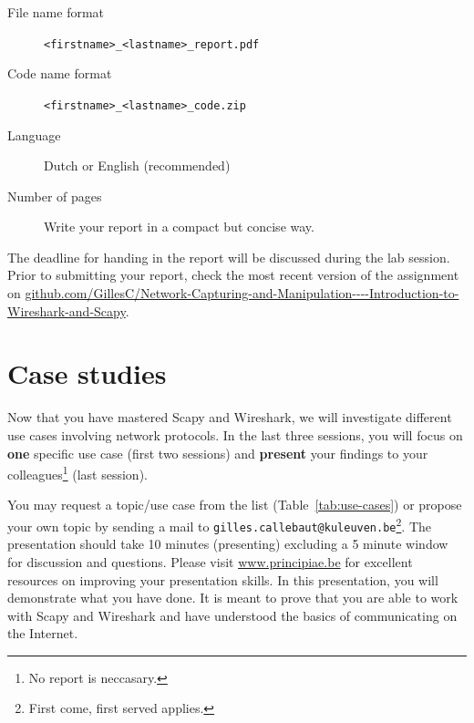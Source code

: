 \documentclass[11pt,a4paper]{article}
\begin{document}
\begin{description}
	\item[File name format]  \texttt{<firstname>\_<lastname>\_report.pdf}
	\item[Code name format]  \texttt{<firstname>\_<lastname>\_code.zip}
	\item[Language] Dutch or English (recommended)
	\item[Number of pages] Write your report in a compact but concise way.
\end{description}


The deadline for handing in the report will be discussed during the lab session.
Prior to submitting your report, check the most recent version of the assignment on \url{github.com/GillesC/Network-Capturing-and-Manipulation----Introduction-to-Wireshark-and-Scapy}.



\section{Case studies}
Now that you have mastered Scapy and Wireshark, we will investigate different use cases involving network protocols. In the last three sessions, you will focus on \textbf{one} specific use case (first two sessions) and \textbf{present} your findings to your colleagues\footnote{No report is neccasary.} (last session). 

You may request a topic/use case from the list (Table~\ref{tab:use-cases}) or propose your own topic by sending a mail to \texttt{gilles.callebaut@kuleuven.be}\footnote{First come, first served applies.}. The presentation should take 10 minutes (presenting) excluding a 5 minute window for discussion and questions. Please visit \url{www.principiae.be} for excellent resources on improving your presentation skills. In this presentation, you will demonstrate what you have done. It is meant to prove that you are able to work with Scapy and Wireshark and have understood the basics of communicating on the Internet.
\end{document}
